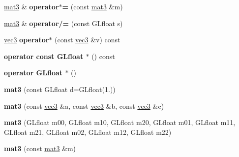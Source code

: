 \begin{DoxyCompactItemize}
\item 
\hypertarget{class_angel_1_1mat3_a8ef95de69545b2343d150609572b26fe}{\hyperlink{class_angel_1_1mat3}{mat3} \& {\bfseries operator$\ast$=} (const \hyperlink{class_angel_1_1mat3}{mat3} \&m)}\label{class_angel_1_1mat3_a8ef95de69545b2343d150609572b26fe}

\item 
\hypertarget{class_angel_1_1mat3_a36819155312f47f6f908d1f3f6979d70}{\hyperlink{class_angel_1_1mat3}{mat3} \& {\bfseries operator/=} (const \-G\-Lfloat s)}\label{class_angel_1_1mat3_a36819155312f47f6f908d1f3f6979d70}

\item 
\hypertarget{class_angel_1_1mat3_a816f9f6ba6cbebea56b0f84432643e4a}{\hyperlink{struct_angel_1_1vec3}{vec3} {\bfseries operator$\ast$} (const \hyperlink{struct_angel_1_1vec3}{vec3} \&v) const }\label{class_angel_1_1mat3_a816f9f6ba6cbebea56b0f84432643e4a}

\item 
\hypertarget{class_angel_1_1mat3_a1d8dde0ed668c30af292f9b53253dec9}{{\bfseries operator const G\-Lfloat $\ast$} () const }\label{class_angel_1_1mat3_a1d8dde0ed668c30af292f9b53253dec9}

\item 
\hypertarget{class_angel_1_1mat3_a5b68f66855c70b79a86a3ddc65acda6f}{{\bfseries operator G\-Lfloat $\ast$} ()}\label{class_angel_1_1mat3_a5b68f66855c70b79a86a3ddc65acda6f}

\item 
\hypertarget{class_angel_1_1mat3_a169ddab082b2c0da9ab028ec1a1c223c}{{\bfseries mat3} (const \-G\-Lfloat d=\-G\-Lfloat(1.))}\label{class_angel_1_1mat3_a169ddab082b2c0da9ab028ec1a1c223c}

\item 
\hypertarget{class_angel_1_1mat3_a62a888ec4f7f9246960253eea5acfc89}{{\bfseries mat3} (const \hyperlink{struct_angel_1_1vec3}{vec3} \&a, const \hyperlink{struct_angel_1_1vec3}{vec3} \&b, const \hyperlink{struct_angel_1_1vec3}{vec3} \&c)}\label{class_angel_1_1mat3_a62a888ec4f7f9246960253eea5acfc89}

\item 
\hypertarget{class_angel_1_1mat3_adac89ce7cc0b0b566f0dcd66e9746119}{{\bfseries mat3} (\-G\-Lfloat m00, \-G\-Lfloat m10, \-G\-Lfloat m20, \-G\-Lfloat m01, \-G\-Lfloat m11, \-G\-Lfloat m21, \-G\-Lfloat m02, \-G\-Lfloat m12, \-G\-Lfloat m22)}\label{class_angel_1_1mat3_adac89ce7cc0b0b566f0dcd66e9746119}

\item 
\hypertarget{class_angel_1_1mat3_a1315bcb40b29673956e48f7c807a8e6e}{{\bfseries mat3} (const \hyperlink{class_angel_1_1mat3}{mat3} \&m)}\label{class_angel_1_1mat3_a1315bcb40b29673956e48f7c807a8e6e}


\end{DoxyCompactItemize}
